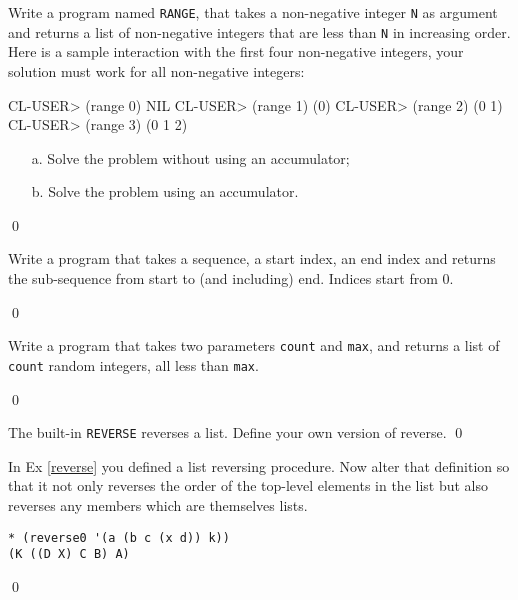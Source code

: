 \documentclass[a4paper,11pt]{article}
\begin{document}
\begin{uexercise}[*]
Write a program named \Verb+RANGE+, that takes a non-negative integer
\Verb+N+ as argument and returns a list of non-negative integers that
are less than \Verb+N+ in increasing order.  Here is a sample
interaction with the first four non-negative integers, your solution
must work for all non-negative integers: 

\begin{lispcode}
CL-USER> (range 0)
NIL
CL-USER> (range 1)
(0)
CL-USER> (range 2)
(0 1)
CL-USER> (range 3)
(0 1 2)
\end{lispcode}

\begin{itemize}
\item[a.] Solve the problem without using an accumulator;
\item[b.] Solve the problem using an accumulator.
\end{itemize}

\qed
\end{uexercise}

\begin{uexercise}[*]
Write a program that takes a sequence, a start index, an end index
and returns the sub-sequence from start to (and including) end.
Indices start from 0.

\qed
\end{uexercise}

\begin{uexercise}[*]
Write a program that takes two parameters \Verb+count+ and \Verb+max+,
and returns a list of \Verb+count+ random integers, all less than
\Verb+max+.

\qed
\end{uexercise}

\begin{uexercise}
\label{reverse}
The built-in \Verb+REVERSE+ reverses a list. Define your own version of reverse.
\qed
\end{uexercise}

\begin{uexercise}

In Ex \ref{reverse} you defined a list reversing procedure. Now alter that definition so that it  not only reverses the order of the top-level elements in the list but also reverses any members which are themselves lists.

{\small
\begin{Verbatim}
* (reverse0 '(a (b c (x d)) k))
(K ((D X) C B) A)
\end{Verbatim}
}
\qed
\end{uexercise}
\end{document}
